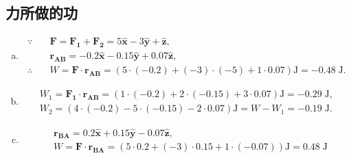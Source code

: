 \subsection{力所做的功}
\begin{enumerate}[(a)]
	\item
	\[
	\begin{aligned}
	\because \quad
	&\bm{F} = \bm{F_1} + \bm{F_2} = 5\bm{\hat{x}} - 3\bm{\hat{y}} + \bm{\hat{z}}, \\
	&\bm{r_{AB}} = -0.2\bm{\hat{x}} - 0.15\bm{\hat{y}} + 0.07\bm{\hat{z}}, \\
	\therefore \quad
	&W = \bm{F} \cdot \bm{r_{AB}} = (5 \cdot (-0.2) + (-3)\cdot (-5) + 1 \cdot 0.07) \textrm{J} = -0.48\; \textrm{J}.
\end{aligned}
	\]
	\item
	\[
	\begin{aligned}
	W_1 = \bm{F_1} \cdot \bm{r_{AB}} = (1 \cdot (-0.2) + 2 \cdot (-0.15) + 3 \cdot 0.07)\textrm{J} = -0.29\;\textrm{J}, \\
	W_2 = (4 \cdot (-0.2) -5 \cdot (-0.15) -2 \cdot 0.07)\textrm{J} = W - W_1= -0.19\;\textrm{J} .
\end{aligned}
	\]
	\item
	\[
	\begin{aligned}
	&\bm{r_{BA}} =  0.2\bm{\hat{x}} + 0.15\bm{\hat{y}} - 0.07\bm{\hat{z}}, \\
	 &W = \bm{F} \cdot \bm{r_{BA}} = (5 \cdot 0.2 + (-3)\cdot 0.15 + 1 \cdot (-0.07)) \textrm{J} = 0.48\; \textrm{J}
\end{aligned}
	\]
\end{enumerate}
